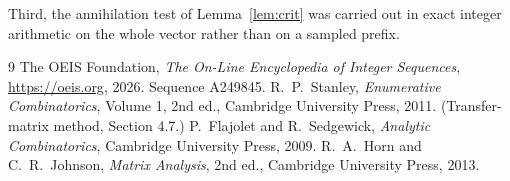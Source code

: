 \documentclass[11pt,a4paper]{article}
\theoremstyle{plain}
\theoremstyle{definition}
\begin{document}
Third, the annihilation test of Lemma~\ref{lem:crit} was carried out in exact integer
arithmetic on the whole vector rather than on a sampled prefix.

\begin{thebibliography}{9}
 The OEIS Foundation, \emph{The On-Line Encyclopedia of Integer
Sequences}, \url{https://oeis.org}, 2026. Sequence A249845.
 R.~P.~Stanley, \emph{Enumerative Combinatorics}, Volume 1, 2nd ed.,
Cambridge University Press, 2011. (Transfer-matrix method, Section 4.7.)
 P.~Flajolet and R.~Sedgewick, \emph{Analytic Combinatorics}, Cambridge
University Press, 2009.
 R.~A.~Horn and C.~R.~Johnson, \emph{Matrix Analysis}, 2nd ed., Cambridge
University Press, 2013.
\end{thebibliography}
\end{document}
